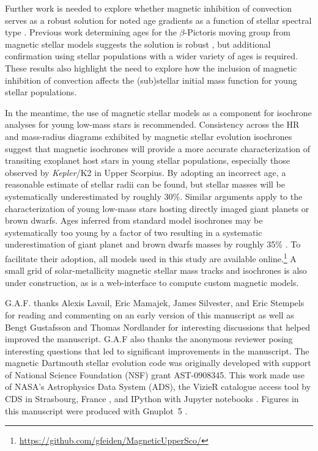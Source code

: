 \documentclass{aa}
\begin{document}
Further work is needed to explore whether magnetic inhibition of convection serves as a robust solution for noted age gradients as a function of stellar spectral type \citep[e.g.,][]{Naylor2009, Herczeg2015}. Previous work determining ages for the $\beta$-Pictoris moving group from magnetic stellar models suggests the solution is robust \citep{MM10, Malo2014, Binks2016}, but additional confirmation using stellar populations with a wider variety of ages is required. These results also highlight the need to explore how the inclusion of magnetic inhibition of convection affects the (sub)stellar initial mass function for young stellar populations.

In the meantime, the use of magnetic stellar models as a component for isochrone analyses for young low-mass stars is recommended. Consistency across the HR and mass-radius diagrams exhibited by magnetic stellar evolution isochrones suggest that magnetic isochrones will provide a more accurate characterization of transiting exoplanet host stars in young stellar populations, especially those observed by \emph{Kepler}/K2 in Upper Scorpius. By adopting an incorrect age, a reasonable estimate of stellar radii can be found, but stellar masses will be systematically underestimated by roughly 30\%. Similar arguments apply to the characterization of young low-mass stars hosting directly imaged giant planets or brown dwarfs. Ages inferred from standard model isochrones may be systematically too young by a factor of two resulting in a systematic underestimation of giant planet and brown dwarfs masses by roughly 35\% \citep{Baraffe2003}. To facilitate their adoption, all models used in this study are available online.\footnote{\url{https://github.com/gfeiden/MagneticUpperSco/}} A small grid of solar-metallicity magnetic stellar mass tracks and isochrones is also under construction, as is a web-interface to compute custom magnetic models.

\begin{acknowledgements}
G.A.F. thanks Alexis Lavail, Eric Mamajek, James Silvester, and Eric Stempels for reading and commenting on an early version of this manuscript as well as Bengt Gustafsson and Thomas Nordlander for interesting discussions that helped improved the manuscript. G.A.F also thanks the anonymous reviewer posing interesting questions that led to significant improvements in the manuscript. The magnetic Dartmouth stellar evolution code was originally developed with support of National Science Foundation (NSF) grant AST-0908345. This work made use of NASA's Astrophysics Data System (ADS), the VizieR catalogue access tool by CDS in Strasbourg, France \citep{Ochsenbein2000}, and IPython with Jupyter notebooks \citep{Perez2007}. Figures in this manuscript were produced with Gnuplot~5 \citep{Gnuplot5.0}.
\end{acknowledgements}
\end{document}
